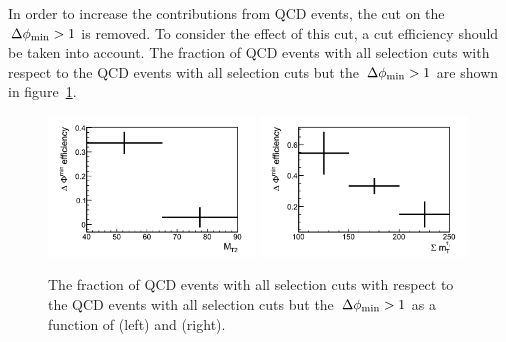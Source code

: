In order to increase the contributions from QCD events, the cut on the $\,{\Delta\phi_{\rm min}}>1$ is removed.
To consider the effect of this cut, a cut efficiency should be taken into account. The 
fraction of QCD events with all selection cuts with respect to the QCD events with all selection 
cuts but the $\,{\Delta\phi_{\rm min}}>1$ are shown in figure~\ref{fig:3QCDbg}.\\
\begin{figure}[!Hhtb]
\centering
\includegraphics[width=0.49\textwidth]{QCDbginTauTau/Bin1-efficiency.png}
\includegraphics[width=0.49\textwidth]{QCDbginTauTau/Bin2-efficiency.png} \\
\caption{ The fraction of QCD events with all selection cuts with respect to the QCD events with all selection 
cuts but the $\,{\Delta\phi_{\rm min}}>1$ as a function of \mttwo (left) and \SumMT (right).}
\label{fig:3QCDbg}
\end{figure}

